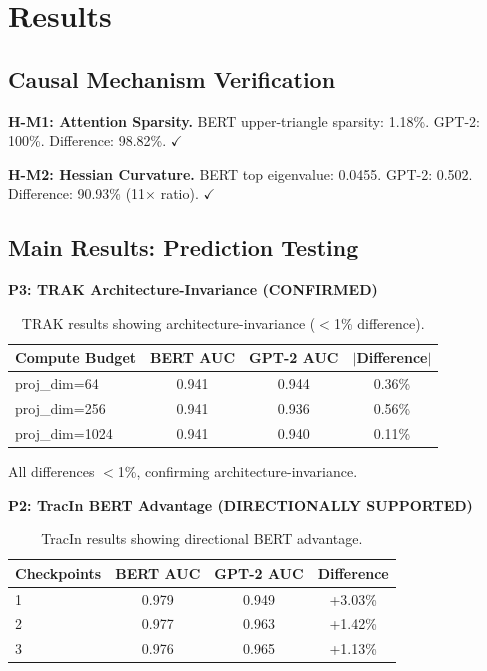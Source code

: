 \section{Results}

\subsection{Causal Mechanism Verification}

\textbf{H-M1: Attention Sparsity.} BERT upper-triangle sparsity: 1.18\%. GPT-2: 100\%. Difference: 98.82\%. $\checkmark$

\textbf{H-M2: Hessian Curvature.} BERT top eigenvalue: 0.0455. GPT-2: 0.502. Difference: 90.93\% (11$\times$ ratio). $\checkmark$

\subsection{Main Results: Prediction Testing}

\textbf{P3: TRAK Architecture-Invariance (CONFIRMED)}

\begin{table}[h]
\centering
\begin{tabular}{@{}lccc@{}}
\toprule
Compute Budget & BERT AUC & GPT-2 AUC & $|$Difference$|$ \\
\midrule
proj\_dim=64 & 0.941 & 0.944 & 0.36\% \\
proj\_dim=256 & 0.941 & 0.936 & 0.56\% \\
proj\_dim=1024 & 0.941 & 0.940 & 0.11\% \\
\bottomrule
\end{tabular}
\caption{TRAK results showing architecture-invariance ($<$1\% difference).}
\label{tab:trak}
\end{table}

All differences $<$1\%, confirming architecture-invariance.

\textbf{P2: TracIn BERT Advantage (DIRECTIONALLY SUPPORTED)}

\begin{table}[h]
\centering
\begin{tabular}{@{}lccc@{}}
\toprule
Checkpoints & BERT AUC & GPT-2 AUC & Difference \\
\midrule
1 & 0.979 & 0.949 & +3.03\% \\
2 & 0.977 & 0.963 & +1.42\% \\
3 & 0.976 & 0.965 & +1.13\% \\
\bottomrule
\end{tabular}
\caption{TracIn results showing directional BERT advantage.}
\label{tab:tracin}
\end{table}

